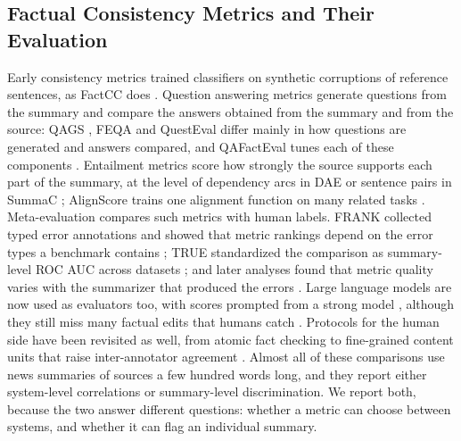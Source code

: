\subsection{Factual Consistency Metrics and Their Evaluation}
Early consistency metrics trained classifiers on synthetic corruptions of reference sentences, as FactCC does \citep{kryscinski2020factcc}. Question answering metrics generate questions from the summary and compare the answers obtained from the summary and from the source: QAGS \citep{wang2020qags}, FEQA \citep{durmus2020feqa} and QuestEval \citep{scialom2021questeval} differ mainly in how questions are generated and answers compared, and QAFactEval tunes each of these components \citep{fabbri2022qafacteval}. Entailment metrics score how strongly the source supports each part of the summary, at the level of dependency arcs in DAE \citep{goyal2021dae} or sentence pairs in SummaC \citep{laban2022summac}; AlignScore trains one alignment function on many related tasks \citep{zha2023alignscore}. Meta-evaluation compares such metrics with human labels. FRANK collected typed error annotations and showed that metric rankings depend on the error types a benchmark contains \citep{pagnoni2021frank}; TRUE standardized the comparison as summary-level ROC AUC across datasets \citep{honovich2022true}; and later analyses found that metric quality varies with the summarizer that produced the errors \citep{tang2023understanding}. Large language models are now used as evaluators too, with scores prompted from a strong model \citep{liu2023geval}, although they still miss many factual edits that humans catch \citep{laban2023summedits}. Protocols for the human side have been revisited as well, from atomic fact checking \citep{min2023factscore} to fine-grained content units that raise inter-annotator agreement \citep{liu2023rose}. Almost all of these comparisons use news summaries of sources a few hundred words long, and they report either system-level correlations or summary-level discrimination. We report both, because the two answer different questions: whether a metric can choose between systems, and whether it can flag an individual summary.

